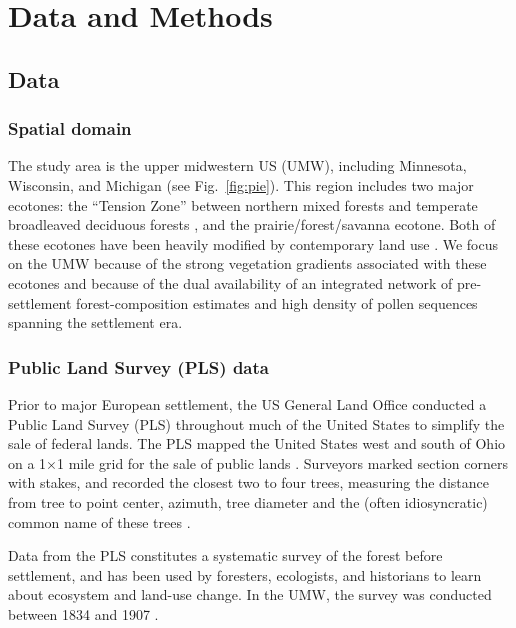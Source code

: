 \documentclass[12pt]{article}
\begin{document}
\section{Data and Methods}

\subsection{Data}

\subsubsection{Spatial domain}

The study area is the upper midwestern US (UMW), including Minnesota,
Wisconsin, and Michigan (see Fig.~\ref{fig:pie}).  This region
includes two major ecotones: the ``Tension Zone'' between northern
mixed forests and temperate broadleaved deciduous forests
\citet{curtis1959vegetation}, and the prairie/forest/savanna ecotone.
Both of these ecotones have been heavily modified by contemporary land
use \citep{goring_witness}. We focus on the UMW because of the strong
vegetation gradients associated with these ecotones and because of the
dual availability of an integrated network of pre-settlement
forest-composition estimates \citep{goring_witness} and high density
of pollen sequences spanning the settlement era.

\subsubsection{Public Land Survey (PLS) data}
Prior to major European settlement, the US General Land Office
conducted a Public Land Survey (PLS) throughout much of the United
States to simplify the sale of federal lands. The PLS mapped the
United States west and south of Ohio on a 1$\times$1 mile grid for the
sale of public lands \citep{stewart1935public,
  white1983history}. Surveyors marked section corners with stakes, and
recorded the closest two to four trees, measuring the distance from
tree to point center, azimuth, tree diameter and the (often
idiosyncratic) common name of these trees
\citep{mladenoff2002narrowing}.

Data from the PLS constitutes a systematic survey of the forest before
settlement, and has been used by foresters, ecologists, and historians
to learn about ecosystem and land-use change. In the UMW, the survey
was conducted between 1834 and 1907 \citep{stewart1935public}.
\end{document}
